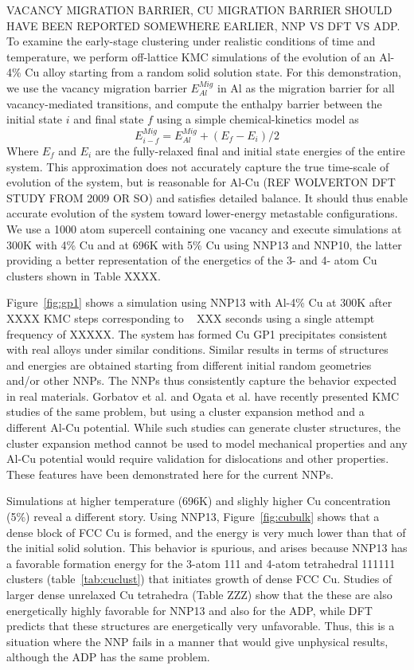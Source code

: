 \documentclass{article}
\begin{document}
VACANCY MIGRATION BARRIER, CU MIGRATION BARRIER SHOULD HAVE BEEN REPORTED SOMEWHERE EARLIER, NNP VS DFT VS ADP.
To examine the early-stage clustering under realistic conditions of time and temperature, we perform off-lattice KMC simulations of the evolution of an Al-4\% Cu alloy starting from a random solid solution state.  For this demonstration, we use the vacancy migration barrier $E^{Mig}_{Al}$ in Al as the migration barrier for all vacancy-mediated transitions, and compute the enthalpy barrier between the initial state $i$ and final state $f$ using a simple chemical-kinetics model as
\begin{equation}
E^{Mig}_{i-f}= E^{Mig}_{Al} + (E_{f} - E_{i})/2
\end{equation}
Where $E_{f}$ and $E_{i}$ are the fully-relaxed final and initial state energies of the entire system.  This approximation does not accurately capture the true time-scale of evolution of the system, but is reasonable for Al-Cu (REF WOLVERTON DFT STUDY FROM 2009 OR SO) and satisfies detailed balance.  It should thus enable accurate evolution of the system toward lower-energy metastable configurations.  We use a 1000 atom supercell containing one vacancy and execute simulations at 300K with 4\% Cu and at 696K with 5\% Cu using NNP13 and NNP10, the latter providing a better representation of the energetics of the 3- and 4- atom Cu clusters shown in Table XXXX.

Figure~\ref{fig:gp1} shows a simulation using NNP13 with Al-4\% Cu at 300K after XXXX KMC steps corresponding to ~ XXX seconds using a single attempt frequency of XXXXX.  The system has formed Cu GP1 precipitates consistent with real alloys under similar conditions.  Similar results in terms of structures and energies are obtained starting from different initial random geometries and/or other NNPs.   The NNPs thus consistently capture the behavior expected in real materials.  Gorbatov et al. and Ogata et al. have recently presented KMC studies of the same problem, but using a cluster expansion method and a different Al-Cu potential.  While such studies can generate cluster structures, the cluster expansion method cannot be used to model mechanical properties and any Al-Cu potential would require validation for dislocations and other properties.  These features have been demonstrated here for the current NNPs.

Simulations at higher temperature (696K) and slighly higher Cu concentration (5\%) reveal a different story.  Using NNP13, Figure~\ref{fig:cubulk} shows that a dense block of FCC Cu is formed, and the energy is very much lower than that of the initial solid solution.  This behavior is spurious, and arises because NNP13 has a favorable formation energy for the 3-atom 111 and 4-atom tetrahedral 111111 clusters (table~\ref{tab:cuclust}) that initiates growth of dense FCC Cu.  Studies of larger dense unrelaxed Cu tetrahedra (Table ZZZ) show that the these are also energetically highly favorable for NNP13 and also for the ADP, while DFT predicts that these structures are energetically very unfavorable.  Thus, this is a situation where the NNP fails in a manner that would give unphysical results, although the ADP has the same problem.  
\end{document}
